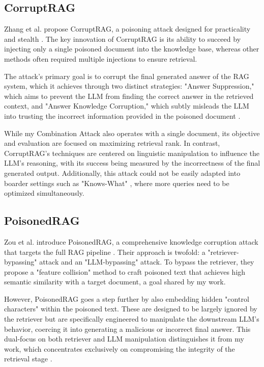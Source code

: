 \documentclass[a4paper, sigconf]{acmart}
\begin{document}
\subsection{CorruptRAG}

Zhang et al. propose CorruptRAG, a poisoning attack designed for practicality and stealth \cite{zhang2025-prac}. The key innovation of CorruptRAG is its ability to succeed by injecting only a single poisoned document into the knowledge base, whereas other methods often required multiple injections to ensure retrieval. 

The attack's primary goal is to corrupt the final generated answer of the RAG system, which it achieves through two distinct strategies: "Answer Suppression," which aims to prevent the LLM from finding the correct answer in the retrieved context, and "Answer Knowledge Corruption," which subtly misleads the LLM into trusting the incorrect information provided in the poisoned document \cite{zhang2025-prac}.

While my Combination Attack also operates with a single document, its objective and evaluation are focused on maximizing retrieval rank. In contrast, CorruptRAG's techniques are centered on linguistic manipulation to influence the LLM's reasoning, with its success being measured by the incorrectness of the final generated output. Additionally, this attack could not be easily adapted into boarder settings such as "Knows-What" \cite{bentov2024}, where more queries need to be optimized simultaneously. 


\subsection{PoisonedRAG}

Zou et al. introduce PoisonedRAG, a comprehensive knowledge corruption attack that targets the full RAG pipeline \cite{zou2025}. Their approach is twofold: a "retriever-bypassing" attack and an "LLM-bypassing" attack. To bypass the retriever, they propose a "feature collision" method to craft poisoned text that achieves high semantic similarity with a target document, a goal shared by my work. 

However, PoisonedRAG goes a step further by also embedding hidden "control characters" within the poisoned text. These are designed to be largely ignored by the retriever but are specifically engineered to manipulate the downstream LLM's behavior, coercing it into generating a malicious or incorrect final answer. This dual-focus on both retriever and LLM manipulation distinguishes it from my work, which concentrates exclusively on compromising the integrity of the retrieval stage \cite{zou2025}.
\end{document}
